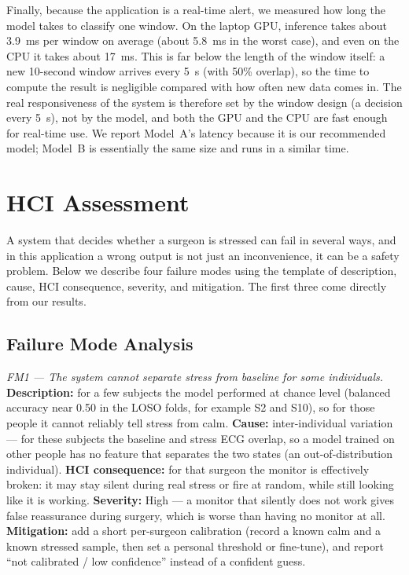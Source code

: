 \documentclass[conference]{IEEEtran}
\begin{document}
Finally, because the application is a real-time alert, we measured how long the
model takes to classify one window. On the laptop GPU, inference takes about
3.9~ms per window on average (about 5.8~ms in the worst case), and even on the CPU
it takes about 17~ms. This is far below the length of the window itself: a new
10-second window arrives every 5~s (with 50\% overlap), so the time to compute the
result is negligible compared with how often new data comes in. The real
responsiveness of the system is therefore set by the window design (a decision
every 5~s), not by the model, and both the GPU and the CPU are fast enough for
real-time use. We report Model~A's latency because it is our recommended model;
Model~B is essentially the same size and runs in a similar time.

\section{HCI Assessment}
A system that decides whether a surgeon is stressed can fail in several ways, and
in this application a wrong output is not just an inconvenience, it can be a
safety problem. Below we describe four failure modes using the template of
description, cause, HCI consequence, severity, and mitigation. The first three
come directly from our results.

\subsection{Failure Mode Analysis}

\textit{FM1 --- The system cannot separate stress from baseline for some
individuals.}
\textbf{Description:} for a few subjects the model performed at chance level
(balanced accuracy near 0.50 in the LOSO folds, for example S2 and S10), so for
those people it cannot reliably tell stress from calm.
\textbf{Cause:} inter-individual variation --- for these subjects the baseline and
stress ECG overlap, so a model trained on other people has no feature that
separates the two states (an out-of-distribution individual).
\textbf{HCI consequence:} for that surgeon the monitor is effectively broken: it
may stay silent during real stress or fire at random, while still looking like it
is working.
\textbf{Severity:} High --- a monitor that silently does not work gives false
reassurance during surgery, which is worse than having no monitor at all.
\textbf{Mitigation:} add a short per-surgeon calibration (record a known calm and
a known stressed sample, then set a personal threshold or fine-tune), and report
``not calibrated / low confidence'' instead of a confident guess.
\end{document}
